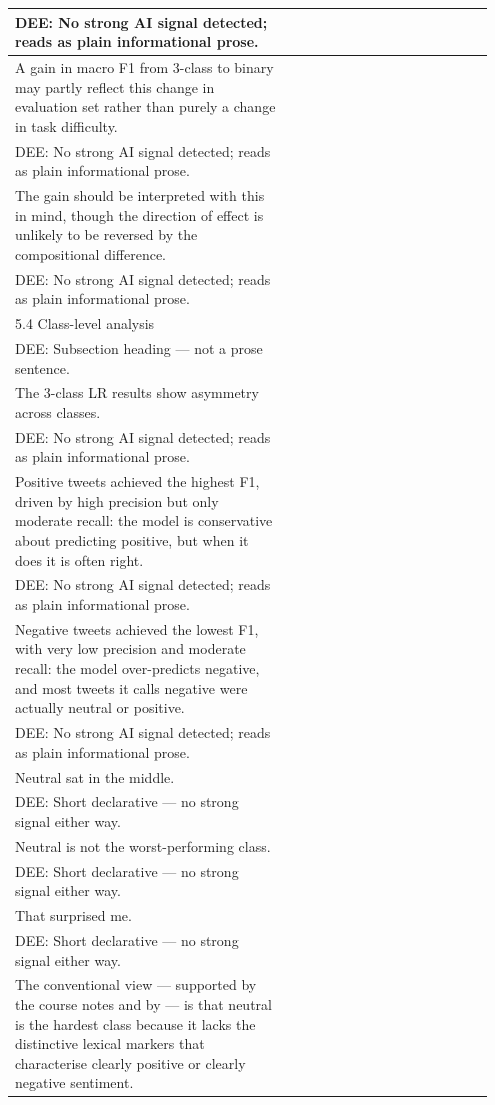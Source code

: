 \documentclass[11pt]{article}
\begin{document}
\begin{longtable}{|p{0.55\linewidth}|p{0.40\linewidth}|}
\hline
DEE: No strong AI signal detected; reads as plain informational prose. & \\
\hline
A gain in macro F1 from 3-class to binary may partly reflect this change in evaluation set rather than purely a change in task difficulty. & \\[2pt]
\hline
DEE: No strong AI signal detected; reads as plain informational prose. & \\
\hline
The gain should be interpreted with this in mind, though the direction of effect is unlikely to be reversed by the compositional difference. & \\[2pt]
\hline
DEE: No strong AI signal detected; reads as plain informational prose. & \\
\hline
5.4 Class-level analysis & \\[2pt]
\hline
DEE: Subsection heading --- not a prose sentence. & \\
\hline
The 3-class LR results show asymmetry across classes. & \\[2pt]
\hline
DEE: No strong AI signal detected; reads as plain informational prose. & \\
\hline
Positive tweets achieved the highest F1, driven by high precision but only moderate recall: the model is conservative about predicting positive, but when it does it is often right. & \\[2pt]
\hline
DEE: No strong AI signal detected; reads as plain informational prose. & \\
\hline
Negative tweets achieved the lowest F1, with very low precision and moderate recall: the model over-predicts negative, and most tweets it calls negative were actually neutral or positive. & \\[2pt]
\hline
DEE: No strong AI signal detected; reads as plain informational prose. & \\
\hline
Neutral sat in the middle. & \\[2pt]
\hline
DEE: Short declarative --- no strong signal either way. & \\
\hline
Neutral is not the worst-performing class. & \\[2pt]
\hline
DEE: Short declarative --- no strong signal either way. & \\
\hline
That surprised me. & \\[2pt]
\hline
DEE: Short declarative --- no strong signal either way. & \\
\hline
The conventional view --- supported by the course notes and by --- is that neutral is the hardest class because it lacks the distinctive lexical markers that characterise clearly positive or clearly negative sentiment. & \\[2pt]

\end{longtable}
\end{document}
